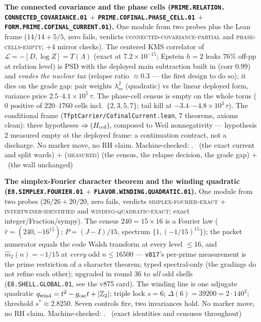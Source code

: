 \documentclass[11pt,a4paper]{article}
\newcommand{\gcar}{g_{\mathrm{car}}}
\newcommand{\Z}{\mathbb{Z}}
\theoremstyle{definition}
\begin{document}
\par\smallskip\noindent\textbf{The connected covariance and the
phase cells (\texttt{PRIME.RELATION.\allowbreak
CONNECTED\_COVARIANCE.01} $+$
\texttt{PRIME.COFINAL.\allowbreak PHASE\_CELL.01} $+$
\texttt{FORM.PRIME.\allowbreak COFINAL\_CURRENT.01}).}
One module from two probes plus the Lean frame ($14/14 + 5/5$,
zero fails, verdicts \textsc{connected-covariance-partial} and
\textsc{phase-cells-empty}; $+4$ mirror checks).  The centered
KMS correlator of $\mathcal{L} = -[D, \log Z] = T(\Lambda)$
(exact at $7.2\times10^{-15}$; Epstein $h{=}2$ leaks $76\%$
off-pp at relation level) is PSD with the deployed main
subtraction built in (corr $0.99$) and \emph{evades the nuclear
tax} (relapse ratio $\approx 0.3$ --- the first design to do
so); it dies on the grade gap: pair weights $\lambda_m^2$
(quadratic) vs the linear deployed form, variance price
$2.5$--$4.1\times10^5\,\tau$.  The phase-cell census is empty
on the whole torus ($0$ positive of $220$--$1760$ cells incl.\
$\{2,3,5,7\}$; tail kill at $-3.4$--$-4.8\times10^3\,\tau$).
The conditional frame
(\texttt{TfptCarrier/CofinalCurrent.lean}, $7$ theorems, axioms
clean): three hypotheses $\Rightarrow (H_{\rm cof})$, composed
to Weil nonnegativity --- hypothesis 2 measured empty at the
deployed frame: a continuation contract, not a discharge.  No
marker move, no RH claim.
Machine-checked: .
\mE\ (the exact current and split wards) $+$
(\textsc{measured}) (the census, the relapse decision, the
grade gap) $+$ \mO\ (the wall unchanged)
\par\smallskip

\par\smallskip\noindent\textbf{The simplex-Fourier character
theorem and the winding quadratic
(\texttt{E8.SIMPLEX.\allowbreak FOURIER.01} $+$
\texttt{FLAVOR.\allowbreak WINDING.\allowbreak QUADRATIC.01}).}
One module from two probes ($26/26 + 20/20$, zero fails,
verdicts \textsc{simplex-fourier-exact} $+$
\textsc{intertwiner-identified} and
\textsc{winding-quadratic-exact}; exact
integer/Fraction/sympy).  The census $240 = 15\times16$ is a
Fourier law ($\hat r = (240, -16^{15})$; $P = (J - I)/15$,
spectrum $\{1, (-1/15)^{15}\}$); the packet numerator equals
the code Walsh transform at every level $\le 16$, and
$\hat m_2(n) = -1/15$ at \emph{every} odd $n \le 16500$ ---
\texttt{v817}'s per-prime measurement is the prime restriction
of a character theorem; typed spectral-only (the gradings do
not refine each other); upgraded in round 36 to \emph{all} odd
shells (\texttt{E8.SHELL.GLOBAL.01}, see the v875 card).  The winding line is one adjugate
quadratic $q_{\rm wind} = t^2 - \gcar t + |\Z_2|$; triple lock
$s = 6$; $\Delta(6) = 39200 = 2\cdot140^2$; threshold
$s^* \approx 2.8250$.  Seven controls fire, two invariances
hold.  No marker move, no RH claim.
Machine-checked: .
\mE\ (exact identities and censuses throughout)
\par\smallskip
\end{document}
